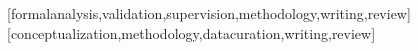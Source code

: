 \documentclass[portuguese]{textolivre}
\begin{document}
\printbibliography\label{sec-bib}


\begin{contributors}
[formalanalysis,validation,supervision,methodology,writing,review]
[conceptualization,methodology,datacuration,writing,review]
\end{contributors}

\begin{dataavailability}
\end{dataavailability}
\end{document}
